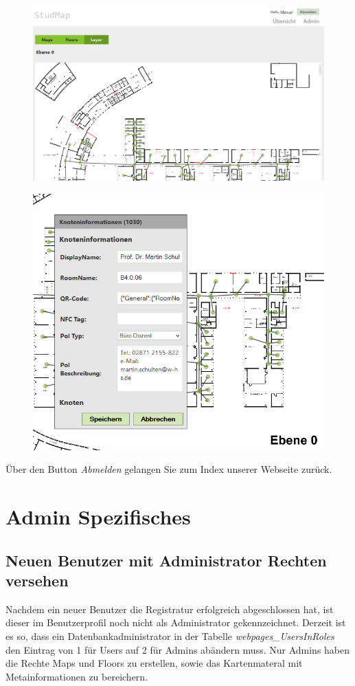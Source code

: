 \begin{figure}[H]
\centering
\includegraphics[width=\linewidth]{../Bilder/Admin/AdminLayer}
\label{fig:AdminLayer}
\end{figure}
\begin{figure}[H]
\centering
\includegraphics[width=\linewidth]{../Bilder/Admin/AdminNodeInfo}
\label{fig:AdminNodeInfo}
\end{figure}
Über den Button \textit{Abmelden} gelangen Sie zum Index unserer Webseite zurück.

\section{Admin Spezifisches}
\subsection*{Neuen Benutzer mit Administrator Rechten versehen}
\label{Administrator Rechte versehen}
Nachdem ein neuer Benutzer die Registratur erfolgreich abgeschlossen hat, ist dieser im Benutzerprofil noch nicht als Administrator gekennzeichnet. Derzeit ist es so, dass ein Datenbankadministrator in der Tabelle \textit{webpages\_UsersInRoles} den Eintrag von 1 für Users auf 2 für Admins abändern muss. Nur Admins haben die Rechte Maps und Floors zu erstellen, sowie das Kartenmateral mit Metainformationen zu bereichern.

